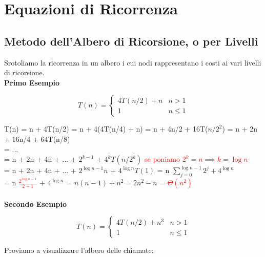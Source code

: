 \documentclass[../cheatSheetAlgoritmi.tex]{subfiles}
\begin{document}
\section{Equazioni di Ricorrenza}
\subsection{Metodo dell'Albero di Ricorsione, o per Livelli}
Srotoliamo la ricorrenza in un albero i cui nodi rappresentano i costi ai vari livelli di ricorsione.\\
\textbf{Primo Esempio}
\begin{center}
	\begin{equation*}
  		T(n)=\begin{cases}
    		4T(n/2) + n & \text{$n > 1$}\\
    		1 & \text{$n \leq 1$}
  		\end{cases}
	\end{equation*}
\end{center}

T(n) = n + 4T(n/2) = n + 4(4T(n/4) + n) = n + 4n/2 + 16T($n/2^{2}$) = n + 2n + 16n/4 + 64T(n/8)\\
= ...\\
= n + 2n + 4n + ... + $2^{k-1}$ + $4^{k}T(n/2^{k})$ \textcolor{red}{se poniamo $2^{k} = n \implies k = \log{n}$}\\
= n + 2n + 4n + ... + $2^{\log{n-1}}n$ + $4^{\log{n}}T(1)$ = n $\sum\limits_{j=0}^{\log{n-1}} {2^{j}} + 4^{\log{n}}$\\
= n \textcolor{red}{$\frac{2^{\log{n}-1}}{2-1}$} + $ 4^{\log{n}}$ = $n(n-1) + n^{2} = 2n^{2} - n$ = \textcolor{red}{$\Theta(n^{2})$}\\\\
\textbf{Secondo Esempio}
\begin{center}
	\begin{equation*}
  		T(n)=\begin{cases}
    		4T(n/2) + n^{3} & \text{$n > 1$}\\
    		1 & \text{$n \leq 1$}
  		\end{cases}
	\end{equation*}
\end{center}

Proviamo a visualizzare l'albero delle chiamate:
\end{document}

